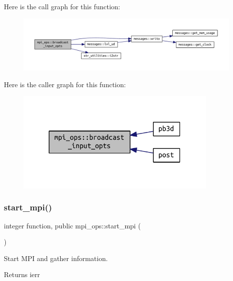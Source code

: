 Here is the call graph for this function\+:\nopagebreak
\begin{figure}[H]
\begin{center}
\leavevmode
\includegraphics[width=350pt]{namespacempi__ops_a932eba1c998dd7a0f1191b55cd754be3_cgraph}
\end{center}
\end{figure}
Here is the caller graph for this function\+:\nopagebreak
\begin{figure}[H]
\begin{center}
\leavevmode
\includegraphics[width=282pt]{namespacempi__ops_a932eba1c998dd7a0f1191b55cd754be3_icgraph}
\end{center}
\end{figure}
\mbox{\label{namespacempi__ops_a804ec65ff711509de1f8873f97bdf967}} 
\subsubsection{\texorpdfstring{start\+\_\+mpi()}{start\_mpi()}}
{\footnotesize\ttfamily integer function, public mpi\+\_\+ops\+::start\+\_\+mpi (\begin{DoxyParamCaption}{ }\end{DoxyParamCaption})}



Start M\+PI and gather information. 

\begin{DoxyReturn}{Returns}
ierr 
\end{DoxyReturn}


